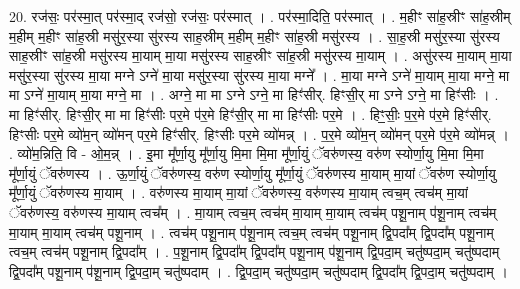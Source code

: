 \documentclass[17pt]{extarticle}
\begin{document}
20. रज॑सः॒ पर॑स्मा॒त् पर॑स्मा॒द् रज॑सो॒ रज॑सः॒ पर॑स्मात् । . पर॑स्मा॒दिति॒ पर॑स्मात् । . म॒हीꣳ सा॑ह॒स्रीꣳ सा॑ह॒स्रीम् म॒हीम् म॒हीꣳ सा॑ह॒स्री मसु॑र॒स्या सु॑रस्य साह॒स्रीम् म॒हीम् म॒हीꣳ सा॑ह॒स्री मसु॑रस्य । . सा॒ह॒स्री मसु॑र॒स्या सु॑रस्य साह॒स्रीꣳ सा॑ह॒स्री मसु॑रस्य मा॒याम् मा॒या मसु॑रस्य साह॒स्रीꣳ सा॑ह॒स्री मसु॑रस्य मा॒याम् । . असु॑रस्य मा॒याम् मा॒या मसु॑र॒स्या सु॑रस्य मा॒या मग्ने ऽग्ने॑ मा॒या मसु॑र॒स्या सु॑रस्य मा॒या मग्ने᳚ । . मा॒या मग्ने ऽग्ने॑ मा॒याम् मा॒या मग्ने॒ मा मा ऽग्ने॑ मा॒याम् मा॒या मग्ने॒ मा । . अग्ने॒ मा मा ऽग्ने ऽग्ने॒ मा हिꣳ॑सीर्. हिꣳसी॒र् मा ऽग्ने ऽग्ने॒ मा हिꣳ॑सीः । . मा हिꣳ॑सीर्. हिꣳसी॒र् मा मा हिꣳ॑सीः पर॒मे प॑र॒मे हिꣳ॑सी॒र् मा मा हिꣳ॑सीः पर॒मे । . हिꣳ॒॒सीः॒ प॒र॒मे प॑र॒मे हिꣳ॑सीर्. हिꣳसीः पर॒मे व्यो॑म॒न् व्यो॑मन् पर॒मे हिꣳ॑सीर्. हिꣳसीः पर॒मे व्यो॑मन्न् । . प॒र॒मे व्यो॑म॒न् व्यो॑मन् पर॒मे प॑र॒मे व्यो॑मन्न् । . व्यो॑म॒न्निति॒ वि - ओ॒म॒न्न् । . इ॒मा मू᳚र्णा॒यु मू᳚र्णा॒यु मि॒मा मि॒मा मू᳚र्णा॒युं ॅवरु॑णस्य॒ वरु॑ण स्योर्णा॒यु मि॒मा मि॒मा मू᳚र्णा॒युं ॅवरु॑णस्य । . ऊ॒र्णा॒युं ॅवरु॑णस्य॒ वरु॑ण स्योर्णा॒यु मू᳚र्णा॒युं ॅवरु॑णस्य मा॒याम् मा॒यां ॅवरु॑ण स्योर्णा॒यु मू᳚र्णा॒युं ॅवरु॑णस्य मा॒याम् । . वरु॑णस्य मा॒याम् मा॒यां ॅवरु॑णस्य॒ वरु॑णस्य मा॒याम् त्वच॒म् त्वच॑म् मा॒यां ॅवरु॑णस्य॒ वरु॑णस्य मा॒याम् त्वच᳚म् । . मा॒याम् त्वच॒म् त्वच॑म् मा॒याम् मा॒याम् त्वच॑म् पशू॒नाम् प॑शू॒नाम् त्वच॑म् मा॒याम् मा॒याम् त्वच॑म् पशू॒नाम् । . त्वच॑म् पशू॒नाम् प॑शू॒नाम् त्वच॒म् त्वच॑म् पशू॒नाम् द्वि॒पदा᳚म् द्वि॒पदा᳚म् पशू॒नाम् त्वच॒म् त्वच॑म् पशू॒नाम् द्वि॒पदा᳚म् । . प॒शू॒नाम् द्वि॒पदा᳚म् द्वि॒पदा᳚म् पशू॒नाम् प॑शू॒नाम् द्वि॒पदा॒म् चतु॑ष्पदा॒म् चतु॑ष्पदाम् द्वि॒पदा᳚म् पशू॒नाम् प॑शू॒नाम् द्वि॒पदा॒म् चतु॑ष्पदाम् । . द्वि॒पदा॒म् चतु॑ष्पदा॒म् चतु॑ष्पदाम् द्वि॒पदा᳚म् द्वि॒पदा॒म् चतु॑ष्पदाम् । \newline
\end{document}
